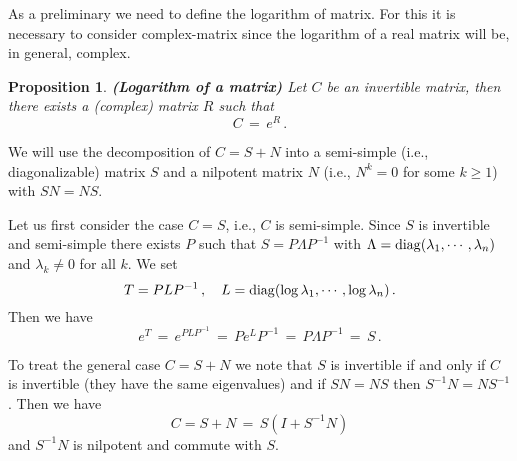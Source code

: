 \documentclass[12pt]{report}
\newtheorem{prop}[theorem]{Proposition}
\newcommand{\proof}{\noindent {\em Proof:~}}
\begin{document}
As a preliminary we need to define the logarithm of matrix.  For this it is necessary 
to consider complex-matrix since the logarithm of a real matrix will be, in general, complex. 

\begin{prop}\label{logmat} {\bf (Logarithm of a matrix)} Let $C$ be an 
invertible matrix, then there exists a (complex) 
matrix $R$ such that
\begin{equation}\label{log}
C\,=\, e^R \,.
 \end{equation}
\end{prop}

\proof  We will use the decomposition of $C= S +N$ into a semi-simple 
(i.e., diagonalizable) matrix $S$ and a nilpotent matrix $N$  
(i.e., $N^k=0$ for some $k \ge1$) with $S N = NS $.  


 Let us first consider the case $C=S$, i.e., $C$ is semi-simple.   
Since $S$ is invertible and semi-simple there exists $P$ such that 
$S=P \Lambda P^{-1}$ with $\Lambda = {\rm diag} ( \lambda_1, \cdots, \lambda_n)$
and $\lambda_k \not=0$ for all $k$.  We set 
\begin{equation}
T= P L P^{-1}  \,, \quad  L= {\rm diag} ( \log \lambda_1, \cdots, \log \lambda_n)\,.
\end{equation}
Then we have 
\begin{equation}
e^T \,=\, e^{PLP^{-1}} \,=\, P e^{L} P^{-1} \,=\, P \Lambda P^{-1} \,=\, S \,.
\end{equation}


 To treat the general case $C=S+N$ we note that $S$ is invertible if and only 
if $C$ is invertible (they have the same eigenvalues) and if $SN=NS$ then $S^{-1}N= NS^{-1}$. 
Then we have 
\begin{equation}
C = S +N \,=\, S( I + S^{-1} N)
\end{equation}
and $S^{-1}N$ is nilpotent and commute with $S$.  
\end{document}
